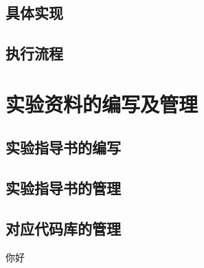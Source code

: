 \subsection{具体实现}

\subsection{执行流程}

\section{实验资料的编写及管理}

\subsection{实验指导书的编写}

\subsection{实验指导书的管理}

\subsection{对应代码库的管理}
你好

